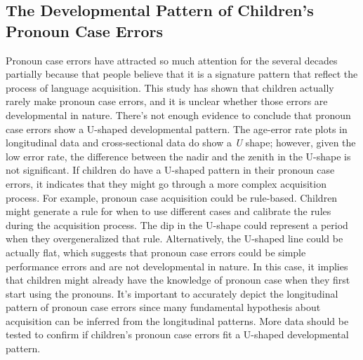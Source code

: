 \subsection{The Developmental Pattern of Children's Pronoun Case Errors}
Pronoun case errors have attracted so much attention for the several decades partially because that people believe that it is a signature  pattern that reflect the process of language acquisition. This study has shown that children actually rarely make pronoun case errors, and it is unclear whether those errors are developmental in nature. There's not enough evidence to conclude that pronoun case errors show a U-shaped developmental pattern. The age-error rate plots in longitudinal data and cross-sectional data do show a \textit{U} shape; however, given the low error rate, the difference between the nadir and the zenith in the U-shape is not significant. If children do have a U-shaped pattern in their pronoun case errors, it indicates that they might go through a more complex acquisition process. For example, pronoun case acquisition could be rule-based. Children might generate a rule for when to use different cases and calibrate the rules during the acquisition process. The dip in the U-shape could represent a period when they overgeneralized that rule. Alternatively, the U-shaped line could be actually flat, which suggests that pronoun case errors could be simple performance errors and are not developmental in nature. In this case, it implies that children might already have the knowledge of pronoun case when they first start using the pronouns. It's important to accurately depict the longitudinal pattern of pronoun case errors since many fundamental hypothesis about acquisition can be inferred from the longitudinal patterns. More data should be tested to confirm if children's pronoun case errors fit a U-shaped developmental pattern.

